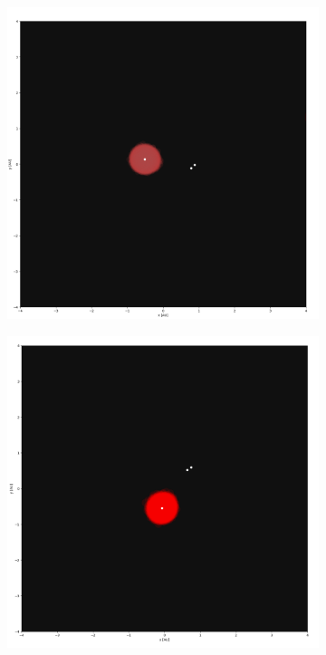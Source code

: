 \begin{figure}[H]
    \centering
    \begin{subfigure}[b]{0.49\textwidth}
        \centering
        \includegraphics[width=\textwidth]{Thesis/graphs/hydro_triple_small0013687.png}   
    \end{subfigure}
    \hfill
    \begin{subfigure}[b]{0.49\textwidth}  
        \centering 
        \includegraphics[width=\textwidth]{Thesis/graphs/hydro_triple_small0018250.png}

\end{subfigure}
\end{figure}
